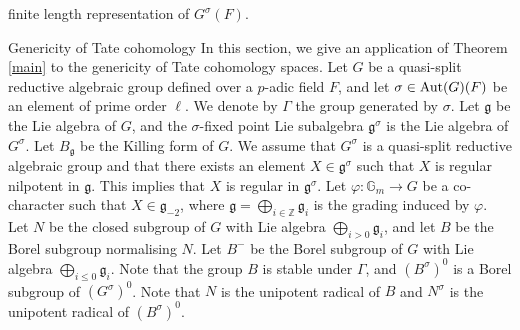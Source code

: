 \documentclass[10pt, reqno]{amsart}
\theoremstyle{plain}
\numberwithin{equation}{section}
\begin{document}
finite length representation of $G^\sigma(F)$.
\begin{section}{Genericity of Tate cohomology}
  In this section, we give an application of Theorem \ref{main} to the
  genericity of Tate cohomology spaces.  Let $G$ be a quasi-split
  reductive algebraic group defined over a $p$-adic field $F$, and let
  $\sigma\in {\rm Aut}(G)(F)$ be an element of prime order $\ell$. We
  denote by $\Gamma$ the group generated by $\sigma$. Let
  $\mathfrak{g}$ be the Lie algebra of $G$, and the $\sigma$-fixed
  point Lie subalgebra $\mathfrak{g}^\sigma$ is the Lie algebra of
  $G^\sigma$.  Let $B_\mathfrak{g}$ be the Killing form of $G$.  We
  assume that $G^\sigma$ is a quasi-split reductive algebraic group
  and that there exists an element $X\in \mathfrak{g}^\sigma$ such
  that $X$ is regular nilpotent in $\mathfrak{g}$. This implies that
  $X$ is regular in $\mathfrak{g}^\sigma$.  Let
  $\varphi:\mathbb{G}_m\rightarrow G$ be a co-character such that
  $X\in \mathfrak{g}_{-2}$, where
  $\mathfrak{g}=\bigoplus_{i\in \mathbb{Z}}\mathfrak{g}_i$ is the
  grading induced by $\varphi$. Let $N$ be the closed subgroup of $G$
  with Lie algebra $\bigoplus_{i>0}\mathfrak{g}_i$, and let $B$ be the
  Borel subgroup normalising $N$.  Let $B^-$ be the Borel subgroup of
  $G$ with Lie algebra $\bigoplus_{i\leq 0}\mathfrak{g}_i$. Note that
  the group $B$ is stable under $\Gamma$, and $(B^\sigma)^0$ is a
  Borel subgroup of $(G^\sigma)^0$. Note that $N$ is the unipotent
  radical of $B$ and $N^\sigma$ is the unipotent radical of
  $(B^\sigma)^0$.


\end{section}
\end{document}
